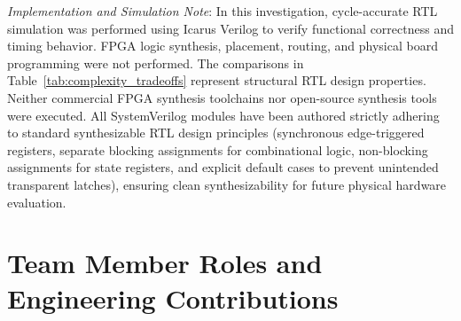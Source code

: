 \documentclass[conference]{IEEEtran}
\begin{document}
\begin{table}[htbp]
\caption{Microarchitectural Structural Resource Comparison}
\label{tab:complexity_tradeoffs}
\centering
\renewcommand{\arraystretch}{1.25}
\end{table}

\textit{Implementation and Simulation Note}: In this investigation, cycle-accurate RTL simulation was performed using Icarus Verilog to verify functional correctness and timing behavior. FPGA logic synthesis, placement, routing, and physical board programming were not performed. The comparisons in Table~\ref{tab:complexity_tradeoffs} represent structural RTL design properties. Neither commercial FPGA synthesis toolchains nor open-source synthesis tools were executed. All SystemVerilog modules have been authored strictly adhering to standard synthesizable RTL design principles (synchronous edge-triggered registers, separate blocking assignments for combinational logic, non-blocking assignments for state registers, and explicit default cases to prevent unintended transparent latches), ensuring clean synthesizability for future physical hardware evaluation.

\section{Team Member Roles and Engineering Contributions}
\label{sec:contributions}
\end{document}
